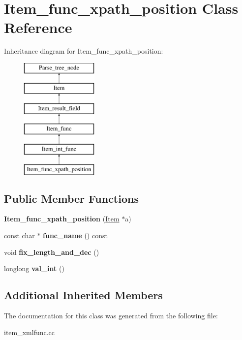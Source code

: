 \hypertarget{classItem__func__xpath__position}{}\section{Item\+\_\+func\+\_\+xpath\+\_\+position Class Reference}
\label{classItem__func__xpath__position}
Inheritance diagram for Item\+\_\+func\+\_\+xpath\+\_\+position\+:\begin{figure}[H]
\begin{center}
\leavevmode
\includegraphics[height=6.000000cm]{classItem__func__xpath__position}
\end{center}
\end{figure}
\subsection*{Public Member Functions}
\begin{DoxyCompactItemize}
\item 
\mbox{\label{classItem__func__xpath__position_a333950253c2535dc3f7c5969ce933021}} 
{\bfseries Item\+\_\+func\+\_\+xpath\+\_\+position} (\mbox{\hyperlink{classItem}{Item}} $\ast$a)
\item 
\mbox{\label{classItem__func__xpath__position_a13b56ee1291f760524dbdda209e7d8cd}} 
const char $\ast$ {\bfseries func\+\_\+name} () const
\item 
\mbox{\label{classItem__func__xpath__position_afa5691c5eefa468993935092c2bc8b47}} 
void {\bfseries fix\+\_\+length\+\_\+and\+\_\+dec} ()
\item 
\mbox{\label{classItem__func__xpath__position_a612f426f3d48f3420570989c7f7ea51f}} 
longlong {\bfseries val\+\_\+int} ()
\end{DoxyCompactItemize}
\subsection*{Additional Inherited Members}


The documentation for this class was generated from the following file\+:\begin{DoxyCompactItemize}
\item 
item\+\_\+xmlfunc.\+cc\end{DoxyCompactItemize}
